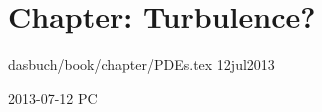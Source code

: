 %


%

%



\section{Chapter: Turbulence?}
\label{c-PDEs}\noindent dasbuch/book/chapter/PDEs.tex 12jul2013
\begin{description}

\item[2013-07-12 PC]

\end{description}

